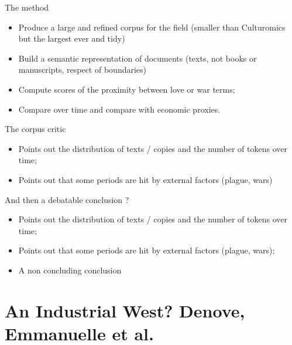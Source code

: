 \documentclass[aspectratio=169]{beamer}
\begin{document}
\begin{frame}{The method}
    \begin{itemize}
        \item Produce a large and refined corpus for the field (smaller than Culturomics but the largest ever and tidy)
        \item Build a semantic representation of documents (texts, not books or manuscripts, respect of boundaries)
        \item Compute scores of the proximity between love or war terms;
        \item Compare over time and compare with economic proxies.
    \end{itemize}
\end{frame}

\begin{frame}{The corpus critic}
    \begin{itemize}
        \item Points out the distribution of texts / copies and the number of tokens over time;
        \item Points out that some periods are hit by external factors (plague, wars)
    \end{itemize}
\end{frame}

\begin{frame}{And then a debatable conclusion ?}
    \begin{itemize}
        \item Points out the distribution of texts / copies and the number of tokens over time;
        \item Points out that some periods are hit by external factors (plague, wars);
        \item A non concluding conclusion
    \end{itemize}
\end{frame}

\section{An Industrial West? Denove, Emmanuelle et al.}
\end{document}
